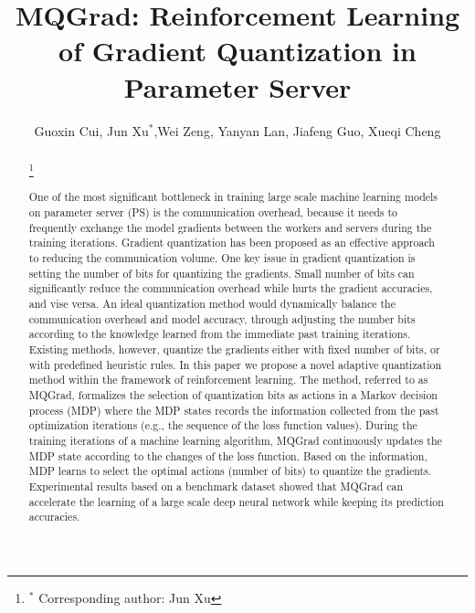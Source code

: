 \documentclass[sigconf]{acmart}
\title[MQGrad]{MQGrad: Reinforcement Learning of Gradient Quantization in Parameter Server}
\author{ Guoxin Cui, Jun Xu$^*$,Wei Zeng, Yanyan Lan, Jiafeng Guo,  Xueqi Cheng}
\affiliation{
  \institution{$^1$University of Chinese Academy of Sciences, Beijing, China\\$^2$CAS Key Lab of Network Data Science \& Technology, Institute of Computing Technology, Chinese Academy of Sciences}
  }
\newcommand\blfootnote[1]{%
  \begingroup
  \renewcommand\thefootnote{}\footnote{#1}%
  \addtocounter{footnote}{-1}%
  \endgroup
}
\begin{document}

\begin{abstract}
	\blfootnote{$^*$ Corresponding author: Jun Xu}
	One of the most significant bottleneck in training large scale machine learning models on parameter server (PS) is the communication overhead, because it needs to frequently exchange the model gradients between the workers and servers during the training iterations. Gradient quantization has been proposed as an effective approach to reducing the communication volume. One key issue in gradient quantization is setting the number of bits for quantizing the gradients. Small number of bits can significantly reduce the communication overhead while hurts the gradient accuracies, and vise versa. An ideal quantization method would dynamically balance the communication overhead and model accuracy, through adjusting the number bits according to the knowledge learned from the immediate past training iterations. Existing methods, however, quantize the gradients either with fixed number of bits, or with predefined heuristic rules. In this paper we propose a novel adaptive quantization method within the framework of reinforcement learning. The method, referred to as MQGrad, formalizes the selection of quantization bits as actions in a Markov decision process (MDP) where the MDP states records the information collected from the past optimization iterations (e.g., the sequence of the loss function values). During the training iterations of a machine learning algorithm, MQGrad continuously updates the MDP state according to the changes of the loss function. Based on the information, MDP learns to select the optimal actions (number of bits) to quantize the gradients. Experimental results based on a benchmark dataset showed that MQGrad can accelerate the learning of a large scale deep neural network while keeping its prediction accuracies.
\end{abstract}

\end{document}
